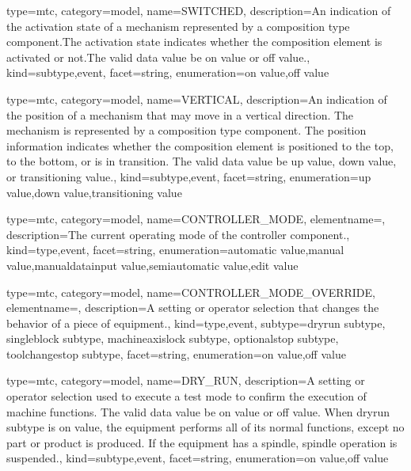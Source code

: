 {
  type=mtc,
  category=model,
  name={SWITCHED},
  description={An indication of the activation state of a mechanism represented by a \gls{composition} type component.The activation state indicates whether the \gls{composition} element is activated or not.The \gls{valid data value} \must be \gls{on value} or \gls{off value}.},
  kind={subtype,event},
  facet={\gls{string}},
  enumeration={\gls{on value},\gls{off value}}
}


{
  type=mtc,
  category=model,
  name={VERTICAL},
  description={An indication of the position of a mechanism that may move in a vertical direction. The mechanism is represented by a \gls{composition} type component. \newline The position information indicates whether the \gls{composition} element is positioned to the top, to the bottom, or is in transition.  \newline The \gls{valid data value} \must be \gls{up value}, \gls{down value}, or \gls{transitioning value}.},
  kind={subtype,event},
  facet={\gls{string}},
  enumeration={\gls{up value},\gls{down value},\gls{transitioning value}}
}


{
  type=mtc,
  category=model,
  name={CONTROLLER\_MODE},
  elementname=,
  description={The current operating mode of the \gls{controller} component.},
  kind={type,event},
  facet={\gls{string}},
  enumeration={\gls{automatic value},\gls{manual value},\gls{manualdatainput value},\gls{semiautomatic value},\gls{edit value}}
}


{
  type=mtc,
  category=model,
  name={CONTROLLER\_MODE\_OVERRIDE},
  elementname=,
  description={A setting or operator selection that changes the behavior of a piece of equipment.},
  kind={type,event},
  subtype={\gls{dryrun subtype}, \gls{singleblock subtype}, \gls{machineaxislock subtype}, \gls{optionalstop subtype}, \gls{toolchangestop subtype}},
  facet={\gls{string}},
  enumeration={\gls{on value},\gls{off value}}
}


{
  type=mtc,
  category=model,
  name={DRY\_RUN},
  description={A setting or operator selection used to execute a test mode to confirm the execution of machine functions.  The \gls{valid data value} \must be \gls{on value} or \gls{off value}. \newline When \gls{dryrun subtype} is \gls{on value}, the equipment performs all of its normal functions, except no part or product is produced.  If the equipment has a spindle, spindle operation is suspended.},
  kind={subtype,event},
  facet={\gls{string}},
  enumeration={\gls{on value},\gls{off value}}
}


